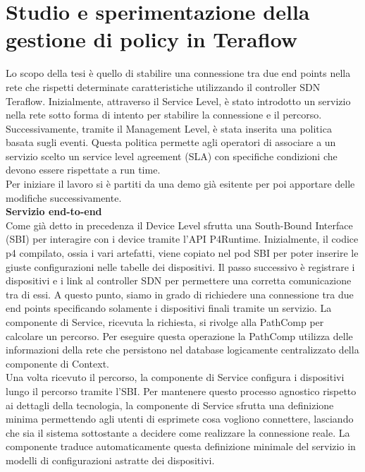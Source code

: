 \chapter{Studio e sperimentazione della gestione di policy in Teraflow}
\label{cap:policy}
Lo scopo della tesi è quello di stabilire una connessione tra due end points nella rete che rispetti determinate caratteristiche utilizzando il controller SDN Teraflow.
Inizialmente, attraverso il Service Level, è stato introdotto un servizio nella rete sotto forma di intento per stabilire la connessione e il percorso. 
Successivamente, tramite il Management Level, è stata inserita una politica basata sugli eventi. Questa politica permette agli operatori 
di associare a un servizio scelto un service level agreement (SLA) con specifiche condizioni che devono essere rispettate a run time.
\\Per iniziare il lavoro si è partiti da una demo già esitente per poi apportare delle modifiche successivamente.
\\\textbf{Servizio end-to-end}
\\Come già detto in precedenza il Device Level sfrutta una South-Bound Interface (SBI) per interagire con i device tramite l'API P4Runtime. 
Inizialmente, il codice p4 compilato, ossia i vari artefatti, viene copiato nel pod SBI per poter inserire le giuste configurazioni nelle tabelle dei dispositivi.
Il passo successivo è registrare i dispositivi e i link al controller SDN per permettere una corretta comunicazione tra di essi.
A questo punto, siamo in grado di richiedere una connessione tra due end points specificando solamente i dispositivi finali tramite un servizio.
La componente di Service, ricevuta la richiesta, si rivolge alla PathComp per calcolare un percorso.
Per eseguire questa operazione la PathComp utilizza delle informazioni della rete che persistono nel database logicamente centralizzato della componente di Context.
\\Una volta ricevuto il percorso, la componente di Service configura i dispositivi lungo il percorso tramite l'SBI.
Per mantenere questo processo agnostico rispetto ai dettagli della tecnologia, la componente di Service 
sfrutta una definizione minima permettendo agli utenti di esprimete cosa vogliono connettere, lasciando che sia il sistema sottostante a decidere come realizzare la connessione reale.
La componente traduce automaticamente questa definizione minimale del servizio in modelli di configurazioni astratte dei dispositivi. 
